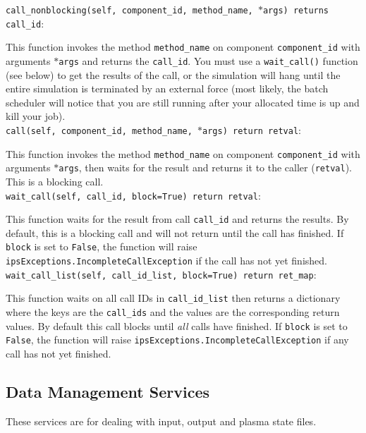 \texttt{call\_nonblocking(self, component\_id, method\_name, $\ast$args) returns call\_id}:
\par
  This function invokes the method \texttt{method\_name} on component 
  \texttt{component\_id} with arguments \texttt{$\ast$args} and returns the \texttt{call\_id}.  You must use a 
  \texttt{wait\_call()} function (see below) to get the results of the call, or the 
  simulation will hang until the entire simulation is terminated by an 
  external force (most likely, the batch scheduler will notice that you 
  are still running after your allocated time is up and kill your job).\\

\texttt{call(self, component\_id, method\_name, $\ast$args) return retval}:
\par
  This function invokes the method \texttt{method\_name} on component 
  \texttt{component\_id} with arguments \texttt{$\ast$args}, then waits for the result and 
  returns it to the caller (\texttt{retval}).  This is a blocking call.\\

\texttt{wait\_call(self, call\_id, block=True) return retval}:
\par
  This function waits for the result from call \texttt{call\_id} and returns the 
  results.  By default, this is a blocking call and will not return until 
  the call has finished.  If \texttt{block} is set to \texttt{False}, the function will 
  raise \texttt{ipsExceptions.IncompleteCallException} if the call has not yet 
  finished.\\

\texttt{wait\_call\_list(self, call\_id\_list, block=True) return ret\_map}:
\par
  This function waits on all call IDs in \texttt{call\_id\_list} then returns a 
  dictionary where the keys are the \texttt{call\_ids} and the values are the 
  corresponding return values.  By default this call blocks until \emph{all} 
  calls have finished.  If \texttt{block} is set to \texttt{False}, the function will 
  raise \texttt{ipsExceptions.IncompleteCallException} if any call has not yet 
  finished.\\


\subsection{Data Management Services}
\label{sec:data_services}
\par
These services are for dealing with input, output and plasma state files.\\

